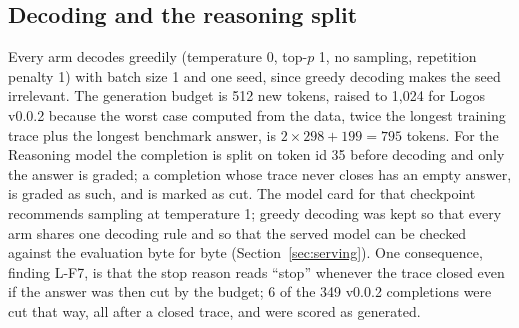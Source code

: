 \subsection{Decoding and the reasoning split}
Every arm decodes greedily (temperature 0, top-$p$ 1, no sampling, repetition penalty 1) with batch size 1 and one seed, since greedy decoding makes the seed irrelevant. The generation budget is 512 new tokens, raised to 1,024 for Logos v0.0.2 because the worst case computed from the data, twice the longest training trace plus the longest benchmark answer, is $2 \times 298 + 199 = 795$ tokens. For the Reasoning model the completion is split on token id 35 before decoding and only the answer is graded; a completion whose trace never closes has an empty answer, is graded as such, and is marked as cut. The model card for that checkpoint recommends sampling at temperature 1; greedy decoding was kept so that every arm shares one decoding rule and so that the served model can be checked against the evaluation byte for byte (Section~\ref{sec:serving}). One consequence, finding L-F7, is that the stop reason reads ``stop'' whenever the trace closed even if the answer was then cut by the budget; 6 of the 349 v0.0.2 completions were cut that way, all after a closed trace, and were scored as generated.

